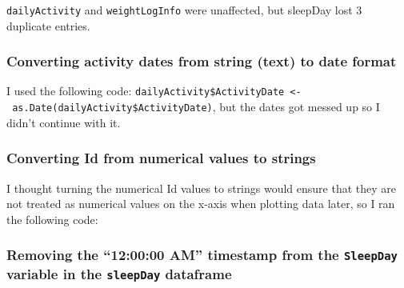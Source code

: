 \documentclass[
]{article}
\newenvironment{Shaded}{\begin{snugshade}}{\end{snugshade}}
\newcommand{\FunctionTok}[1]{\textcolor[rgb]{0.13,0.29,0.53}{\textbf{#1}}}
\newcommand{\NormalTok}[1]{#1}
\newcommand{\OtherTok}[1]{\textcolor[rgb]{0.56,0.35,0.01}{#1}}
\newcommand{\SpecialCharTok}[1]{\textcolor[rgb]{0.81,0.36,0.00}{\textbf{#1}}}
\begin{document}
\texttt{dailyActivity} and \texttt{weightLogInfo} were unaffected, but
sleepDay lost 3 duplicate entries.

\hypertarget{converting-activity-dates-from-string-text-to-date-format}{%
\subsubsection{Converting activity dates from string (text) to date
format}\label{converting-activity-dates-from-string-text-to-date-format}}

I used the following code:
\texttt{dailyActivity\$ActivityDate\ \textless{}-\ as.Date(dailyActivity\$ActivityDate)},
but the dates got messed up so I didn't continue with it.

\hypertarget{converting-id-from-numerical-values-to-strings}{%
\subsubsection{Converting Id from numerical values to
strings}\label{converting-id-from-numerical-values-to-strings}}

I thought turning the numerical Id values to strings would ensure that
they are not treated as numerical values on the x-axis when plotting
data later, so I ran the following code:

\begin{Shaded}
\end{Shaded}

\hypertarget{removing-the-120000-am-timestamp-from-the-sleepday-variable-in-the-sleepday-dataframe}{%
\subsubsection{\texorpdfstring{Removing the ``12:00:00 AM'' timestamp
from the \texttt{SleepDay} variable in the \texttt{sleepDay}
dataframe}{Removing the ``12:00:00 AM'' timestamp from the SleepDay variable in the sleepDay dataframe}}\label{removing-the-120000-am-timestamp-from-the-sleepday-variable-in-the-sleepday-dataframe}}
\end{document}
